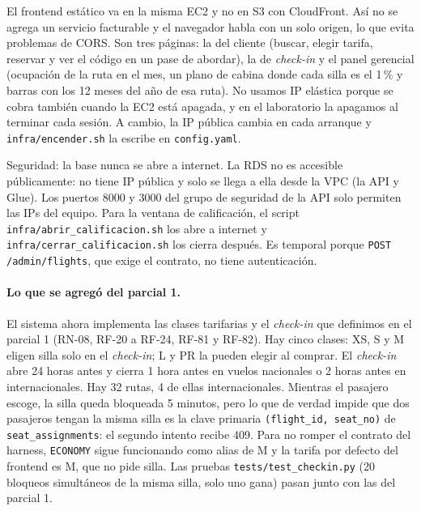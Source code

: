 \documentclass[11pt,letterpaper]{article}
\begin{document}
El frontend estático va en la misma EC2 y no en S3 con CloudFront. Así no se agrega un servicio facturable y el navegador habla con un solo origen, lo que evita problemas de CORS. Son tres páginas: la del cliente (buscar, elegir tarifa, reservar y ver el código en un pase de abordar), la de \emph{check-in} y el panel gerencial (ocupación de la ruta en el mes, un plano de cabina donde cada silla es el 1\,\% y barras con los 12 meses del año de esa ruta). No usamos IP elástica porque se cobra también cuando la EC2 está apagada, y en el laboratorio la apagamos al terminar cada sesión. A cambio, la IP pública cambia en cada arranque y \texttt{infra/encender.sh} la escribe en \texttt{config.yaml}.

Seguridad: la base nunca se abre a internet. La RDS no es accesible públicamente: no tiene IP pública y solo se llega a ella desde la VPC (la API y Glue). Los puertos 8000 y 3000 del grupo de seguridad de la API solo permiten las IPs del equipo. Para la ventana de calificación, el script \texttt{infra/abrir\_calificacion.sh} los abre a internet y \texttt{infra/cerrar\_calificacion.sh} los cierra después. Es temporal porque \texttt{POST /admin/flights}, que exige el contrato, no tiene autenticación.

\paragraph{Lo que se agregó del parcial 1.} El sistema ahora implementa las clases tarifarias y el \emph{check-in} que definimos en el parcial 1 (RN-08, RF-20 a RF-24, RF-81 y RF-82). Hay cinco clases: XS, S y M eligen silla solo en el \emph{check-in}; L y PR la pueden elegir al comprar. El \emph{check-in} abre 24 horas antes y cierra 1 hora antes en vuelos nacionales o 2 horas antes en internacionales. Hay 32 rutas, 4 de ellas internacionales. Mientras el pasajero escoge, la silla queda bloqueada 5 minutos, pero lo que de verdad impide que dos pasajeros tengan la misma silla es la clave primaria \texttt{(flight\_id, seat\_no)} de \texttt{seat\_assignments}: el segundo intento recibe 409. Para no romper el contrato del harness, \texttt{ECONOMY} sigue funcionando como alias de M y la tarifa por defecto del frontend es M, que no pide silla. Las pruebas \texttt{tests/test\_checkin.py} (20 bloqueos simultáneos de la misma silla, solo uno gana) pasan junto con las del parcial 1.
\end{document}
